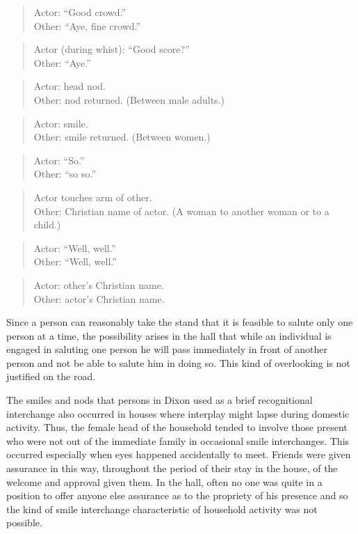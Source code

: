 \documentclass[openany,nobib]{tufte-book}
\begin{document}
\begin{quote}
Actor: ``Good crowd.'' \\
Other: ``Aye, fine crowd.''
\end{quote}

\begin{quote}
Actor (during whist): ``Good score?'' \\
Other: ``Aye.''
\end{quote}

\begin{quote}
Actor: head nod. \\
Other: nod returned. (Between male adults.)
\end{quote}

\begin{quote}
Actor: smile. \\
Other: smile returned. (Between women.)
\end{quote}

\begin{quote}
Actor: ``So.'' \\
Other: ``so so.''
\end{quote}

\begin{quote}
Actor touches arm of other. \\
Other: Christian name of actor. (A woman to another woman or to a
child.)
\end{quote}

\begin{quote}
Actor: ``Well, well.'' \\
Other: ``Well, well.''
\end{quote}

\begin{quote}
Actor: other's Christian name. \\
Other: actor's Christian name.
\end{quote}

\noindent Since a person can reasonably take the stand that it is feasible to
salute only one person at a time, the possibility arises in the hall
that while an individual is engaged in saluting one person he will pass
immediately in front of another person and not be able to salute him in
doing so. This kind of overlooking is not justified on the road.

The smiles and nods that persons in Dixon used as a brief recognitional
interchange also occurred in houses where interplay might lapse during
domestic activity. Thus, the female head of the household tended to
involve those present who were not out of the immediate family in
occasional smile interchanges. This occurred especially when eyes
happened accidentally to meet. Friends were given assurance in this way,
throughout the period of their stay in the house, of the welcome and
approval given them. In the hall, often no one was quite in a position
to offer anyone else assurance as to the propriety of his presence and
so the kind of smile interchange characteristic of household activity
was not possible.
\end{document}
